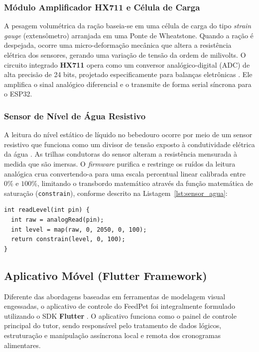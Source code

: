 \documentclass[12pt]{article}\usepackage{sbc-template}\usepackage{graphicx,url}\usepackage[utf8]{inputenc}
\begin{document}
\subsubsection{Módulo Amplificador HX711 e Célula de Carga}
A pesagem volumétrica da ração baseia-se em uma célula de carga do tipo \textit{strain gauge} (extensômetro) arranjada em uma Ponte de Wheatstone. Quando a ração é despejada, ocorre uma micro-deformação mecânica que altera a resistência elétrica dos sensores, gerando uma variação de tensão da ordem de milivolts. O circuito integrado \textbf{HX711} opera como um conversor analógico-digital (ADC) de alta precisão de 24 bits, projetado especificamente para balanças eletrônicas \cite{avia:hx711}. Ele amplifica o sinal analógico diferencial e o transmite de forma serial síncrona para o ESP32.

\subsubsection{Sensor de Nível de Água Resistivo}
A leitura do nível estático de líquido no bebedouro ocorre por meio de um sensor resistivo que funciona como um divisor de tensão exposto à condutividade elétrica da água \cite{components101:water}. As trilhas condutoras do sensor alteram a resistência mensurada à medida que são imersas. O \textit{firmware} purifica e restringe os ruídos da leitura analógica crua convertendo-a para uma escala percentual linear calibrada entre $0\%$ e $100\%$, limitando o transbordo matemático através da função matemática de saturação (\lstinline$constrain$), conforme descrito na Listagem~\ref{lst:sensor_agua}:

\begin{lstlisting}[caption={Sub-rotina para leitura, mapeamento e restrição do percentual hidráulico.}, label={lst:sensor_agua}]
int readLevel(int pin) {
  int raw = analogRead(pin);
  int level = map(raw, 0, 2050, 0, 100);
  return constrain(level, 0, 100);
}
\end{lstlisting}

\subsection{Aplicativo Móvel (Flutter Framework)}
Diferente das abordagens baseadas em ferramentas de modelagem visual engessadas, o aplicativo de controle do FeedPet foi integralmente formulado utilizando o SDK \textbf{Flutter} \cite{flutter:26}. O aplicativo funciona como o painel de controle principal do tutor, sendo responsável pelo tratamento de dados lógicos, estruturação e manipulação assíncrona local e remota dos cronogramas alimentares.
\end{document}
